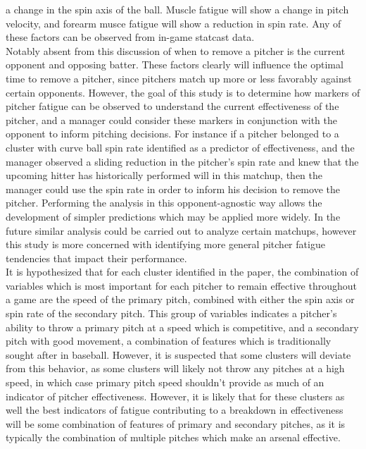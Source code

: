 \documentclass[12 pt]{article}
\begin{document}
a change in the spin axis of the ball. Muscle fatigue will show a change in pitch velocity, 
and forearm musce fatigue will show a reduction in spin rate. Any of these factors can be observed 
from in-game statcast data. 
\\ \indent Notably absent from this discussion of when to remove a pitcher is
the current opponent and opposing batter. These factors clearly will influence the 
optimal time to remove a pitcher, since pitchers match up more or less favorably against 
certain opponents. However, the goal of this study is to determine how markers of pitcher 
fatigue can be observed to understand the current effectiveness of the pitcher, and 
a manager could consider these markers in conjunction with the opponent to inform 
pitching decisions. For instance if a pitcher belonged to a cluster with curve ball spin 
rate identified as a predictor of effectiveness, and the manager observed a sliding 
reduction in the pitcher's spin rate and knew that the upcoming hitter has historically 
performed will in this matchup, then the manager could use the spin rate in order to 
inform his decision to remove the pitcher. Performing the analysis in this opponent-agnostic 
way allows the development of simpler predictions which may be applied more widely. In the 
future similar analysis could be carried out to analyze certain matchups, however this 
study is more concerned with identifying more general pitcher fatigue tendencies that 
impact their performance.
\\ \indent It is hypothesized that for each cluster identified in the paper, the combination 
of variables which is most important for each pitcher to remain effective throughout a game 
are the speed of the primary pitch, combined with either the spin axis or spin rate of the 
secondary pitch. This group of variables indicates a pitcher's ability to throw 
a primary pitch at a speed which is competitive, and a secondary pitch with good movement, 
a combination of features which is traditionally sought after in baseball. However, it is 
suspected that some clusters will deviate from this behavior, as some clusters will likely not 
throw any pitches at a high speed, in which case primary pitch speed shouldn't 
provide as much of an indicator of pitcher effectiveness. However, it is likely that 
for these clusters as well the best indicators of fatigue contributing to a breakdown 
in effectiveness will be some combination of features of primary and secondary pitches, as it 
is typically the combination of multiple pitches which make an arsenal effective. \\
\end{document}
